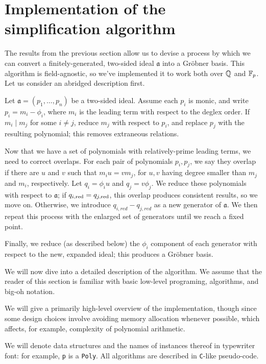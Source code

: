 \section{Implementation of the simplification algorithm}
\label{sec:implementation}

The results from the previous section allow us to devise a process by which we can
convert a finitely-generated, two-sided ideal $\mathfrak{a}$ into a Gr\"obner basis. This
algorithm is field-agnostic, so we've implemented it to work both over $\mathbb{Q}$ and $\mathbb{F}_p$.
Let us consider an abridged description first.

\begin{alg}
    Let $\mathfrak{a} = (p_1,\ldots,p_n)$ be a two-sided ideal. Assume each $p_i$ is
    monic, and write $p_i = m_i - \phi_i$, where $m_i$ is the leading term with respect 
    to the deglex order. If $m_i \mid m_j$ for some $i\neq j$, 
    reduce $m_j$ with respect to $p_i$, and replace $p_j$ with the resulting polynomial; 
    this removes extraneous relations.
    
    Now that we have a set of polynomials with relatively-prime leading terms, we need
    to correct overlaps. For each pair of polynomials $p_i,p_j$, we say they overlap 
    if there are $u$ and $v$ such that $m_i u = v m_j$, for $u, v$ having degree smaller 
    than $m_j$ and $m_i$, respectively. Let $q_i = \phi_i u$ and $q_j = v\phi_j$.
    We reduce these polynomials with respect to $\mathfrak{a}$; if $q_{i,\mathrm{red}} = q_{j,\mathrm{red}}$,
    this overlap produces consistent results, so we move on. Otherwise, we introduce
    $q_{i,red} - q_{j,red}$ as a new generator of $\mathfrak{a}$. 
    We then repeat this process with the enlarged set of generators 
    until we reach a fixed point.
    
    Finally, we reduce (as described below) the $\phi_i$ component of each generator 
    with respect to the new, expanded ideal; this produces a Gr\"obner basis.
\end{alg}

We will now dive into a detailed description of the algorithm. We assume that the
reader of this section is familiar with basic low-level programing, algorithms, and
big-oh notation.

\begin{rem}
    We will give a primarily high-level overview of the implementation, though since some
    design choices involve avoiding memory allocation whenever possible, which
    affects, for example, complexity of polynomial arithmetic. 
    
    We will denote data structures and the names of instances thereof in typewriter font:
    for example, \verb|p| is a \verb|Poly|. All algorithms are described in
    \verb|C|-like pseudo-code.
\end{rem}

